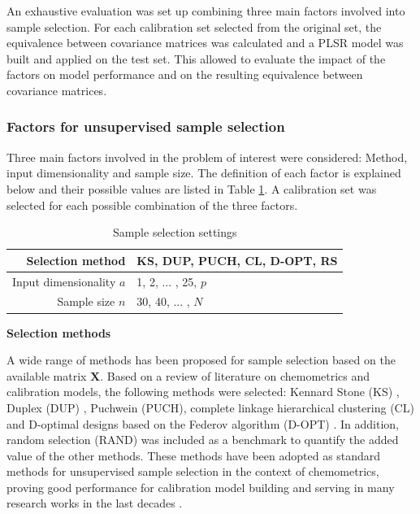 \documentclass[preprint,12pt]{elsarticle}
\begin{document}
An exhaustive evaluation was set up combining three main factors involved into sample selection. For each calibration set selected from the original set, the equivalence between covariance matrices was calculated and a PLSR model was built and applied on the test set. This allowed to evaluate the impact of the factors on model performance and on the resulting equivalence between covariance matrices. 


\subsubsection{Factors for unsupervised sample selection}

Three main factors involved in the problem of interest were considered: Method, input dimensionality and sample size. The definition of each factor is explained below and their possible values are listed in Table \ref{tab_samplesel_settings_exhaustive_search}. A calibration set was selected for each possible combination of the three factors.

\begin{table}[t]
\centering
\begin{tabular}{|r|l|} 
\hline
Selection method & KS, DUP, PUCH, CL, D-OPT, RS\\
\hline
Input dimensionality $a$ & 1, 2, ... , 25, $p$ \\
\hline
Sample size $n$ & 30, 40, ... , $N$ \\
\hline

\end{tabular}
\caption{Sample selection settings}
\label{tab_samplesel_settings_exhaustive_search}
\end{table}

\textbf{Selection methods}

A wide range of methods has been proposed for sample selection based on the available matrix $\mathbf{X}$. Based on a review of literature on chemometrics and calibration models, the following methods were selected: Kennard Stone (KS) \cite{Kennard1969}, Duplex (DUP) \cite{Snee1977}, Puchwein (PUCH)\cite{Puchwein1988}, complete linkage hierarchical clustering (CL) \cite{Naes1990} and D-optimal designs based on the Federov algorithm (D-OPT) \cite{Goos2011}. In addition, random selection (RAND) was included  as a benchmark to quantify the added value of the other methods. These methods have been adopted as standard methods for unsupervised sample selection in the context of chemometrics, proving good performance for calibration model building and serving in many research works in the last decades \cite{Naes1990, Brandmaier2012, Saeys2019, Au2020, Aernouts2011}.
\end{document}
